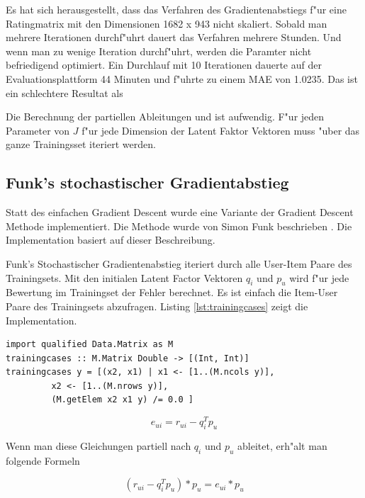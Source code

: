 \documentclass[a4paper, 12pt]{article}
\begin{document}
Es hat sich herausgestellt, dass das Verfahren des Gradientenabstiegs f"ur eine Ratingmatrix mit den Dimensionen 1682 x 943 nicht skaliert. Sobald man mehrere Iterationen durchf"uhrt dauert das Verfahren mehrere Stunden. Und wenn man zu wenige Iteration durchf"uhrt, werden die Paramter nicht befriedigend optimiert. Ein Durchlauf mit 10 Iterationen dauerte auf der Evaluationsplattform 44 Minuten und f"uhrte zu einem MAE von 1.0235. Das ist ein schlechtere Resultat als 

Die Berechnung der partiellen Ableitungen \label{eq:decx} und \label{eq:dectheta} ist aufwendig. F"ur jeden Parameter von $J$ f"ur jede Dimension der Latent Faktor Vektoren muss "uber das ganze Trainingsset iteriert werden.

\subsection{Funk's stochastischer Gradientabstieg}
\label{sec:funksvd}

Statt des einfachen Gradient Descent wurde eine Variante der Gradient Descent Methode implementiert. Die Methode wurde von Simon Funk beschrieben \cite{funk}. Die Implementation basiert auf dieser Beschreibung.

Funk's Stochastischer Gradientenabstieg iteriert durch alle User-Item Paare des Trainingsets. Mit den initialen Latent Factor Vektoren $q_i$ und $p_u$ wird f"ur jede Bewertung im Trainingset der Fehler berechnet. Es ist einfach die Item-User Paare des Trainingsets abzufragen. Listing \ref{lst:trainingcases} zeigt die Implementation.

\begin{lstlisting}[caption=Abfrage des Trainingsets,label=lst:trainingcases]
import qualified Data.Matrix as M  
trainingcases :: M.Matrix Double -> [(Int, Int)]
trainingcases y = [(x2, x1) | x1 <- [1..(M.ncols y)], 
         x2 <- [1..(M.nrows y)],
         (M.getElem x2 x1 y) /= 0.0 ]
\end{lstlisting}

\begin{equation}
  \label{eq:error1}
  e_{ui} = r_{ui} - q_i^T p_u
\end{equation}

Wenn man diese Gleichungen partiell nach $q_i$ und $p_u$ ableitet, erh"alt man folgende Formeln

\begin{equation}
  \label{eq:devqi}
  (r_{ui} - q_i^T p_u) * p_u =  e_{ui} * p_u
\end{equation}
\end{document}
